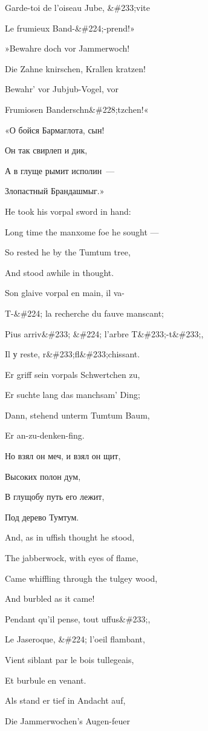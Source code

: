 \documentclass[../main.tex]{subfiles}
\begin{document}
Garde-toi de l'oiseau Jube, \&\#233;vite

Le frumieux Band-\&\#224;-prend!»

»Bewahre doch vor Jammerwoch!

Die Zahne knirschen, Krallen kratzen!

Bewahr' vor Jubjub-Vogel, vor

Frumiosen Banderschn\&\#228;tzchen!«

«О бойся Бармаглота, сын!

Он так свирлеп и дик,

А в глуще рымит исполин~---

Злопастный Брандашмыг.»

He took his vorpal sword in hand:

Long time the manxome foe he sought ---

So rested he by the Tumtum tree,

And stood awhile in thought.

Son glaive vorpal en main, il va-

T-\&\#224; la recherche du fauve manscant;

Pius arriv\&\#233; \&\#224; l'arbre T\&\#233;-t\&\#233;,

Il у reste, r\&\#233;fl\&\#233;chissant.

Er griff sein vorpals Schwertchen zu,

Er suchte lang das manchsam' Ding;

Dann, stehend unterm Tumtum Baum,

Er an-zu-denken-fing.

Но взял он меч, и взял он щит,

Высоких полон дум,

В глущобу путь его лежит,

Под дерево Тумтум.

And, as in uffish thought he stood,

The jabberwock, with eyes of flame,

Came whiffling through the tulgey wood,

And burbled as it came!

Pendant qu'il pense, tout uffus\&\#233;,

Le Jaseroque, \&\#224; l'oeil flambant,

Vient siblant par le bois tullegeais,

Et burbule en venant.

Als stand er tief in Andacht auf,

Die Jammerwochen's Augen-feuer
\end{document}
